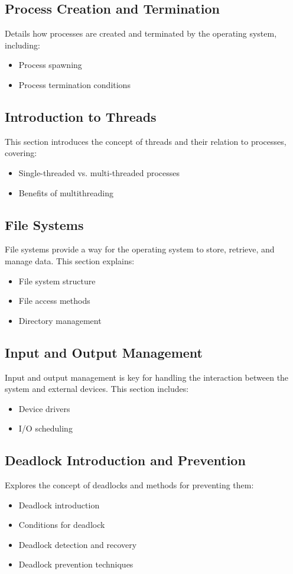 \documentclass{article}
\begin{document}
\subsection{Process Creation and Termination}
Details how processes are created and terminated by the operating system, including:
\begin{itemize}
    \item Process spawning
    \item Process termination conditions
\end{itemize}

\subsection{Introduction to Threads}
This section introduces the concept of threads and their relation to processes, covering:
\begin{itemize}
    \item Single-threaded vs. multi-threaded processes
    \item Benefits of multithreading
\end{itemize}

\subsection{File Systems}
File systems provide a way for the operating system to store, retrieve, and manage data. This section explains:
\begin{itemize}
    \item File system structure
    \item File access methods
    \item Directory management
\end{itemize}

\subsection{Input and Output Management}
Input and output management is key for handling the interaction between the system and external devices. This section includes:
\begin{itemize}
    \item Device drivers
    \item I/O scheduling
\end{itemize}

\subsection{Deadlock Introduction and Prevention}
Explores the concept of deadlocks and methods for preventing them:
\begin{itemize}
    \item Deadlock introduction
    \item Conditions for deadlock
    \item Deadlock detection and recovery
    \item Deadlock prevention techniques
\end{itemize}
\end{document}
